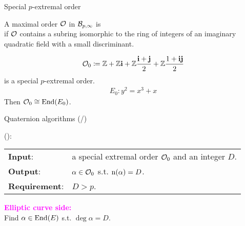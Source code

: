 \begin{frame}{Special $p$-extremal order}
    \begin{definition}[Informal]
        A maximal order $\mathcal{O}$ in $\mathcal{B}_{p,\infty}$ is \\
        if $\mathcal{O}$ contains a subring isomorphic to
        the ring of integers of an imaginary quadratic field with a small discriminant.
    \end{definition}

    \begin{align*}
        \mathcal{O}_0 \coloneqq \mathbb{Z} + \mathbb{Z}\mathbf{i} + \mathbb{Z}\frac{\mathbf{i} + \mathbf{j}}{2} + \mathbb{Z}\frac{1 + \mathbf{i}\mathbf{j}}{2}
    \end{align*}
    is a special $p$-extremal order.
    \begin{align*}
        E_0 : y^2 = x^3 + x
    \end{align*}
    Then $\mathcal{O}_0 \cong \mathrm{End}(E_0)$.
\end{frame}

\newcommand*{\algquatotal}{\total{cnt_alg_quat}}
\begin{frame}{Quaternion algorithms (/\algquatotal{})}

    {\large
    }
    (\cite{KLPT}):\\[5pt]
    \begin{tabular}{l l}
        \textbf{Input}: & a special extremal order $\mathcal{O}_0$ and an integer $D$.\\[3pt]
        \textbf{Output}: & $\alpha \in \mathcal{O}_0$ s.t. $\mathrm{n}(\alpha) = D$.\\[3pt]
        \textbf{Requirement}: & $D > p$.
    \end{tabular}

    \vspace{15pt}
    \textcolor{magenta}{\textbf{Elliptic curve side:}}\\[5pt]
    \quad Find $\alpha \in \mathrm{End}(E)$ s.t. $\deg\alpha = D$.

\end{frame}

